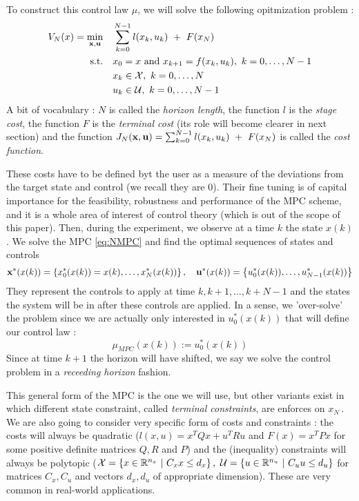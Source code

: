 \documentclass[12pt]{article}
\begin{document}
To construct this control law $\mu$, we will solve the following opitmization problem :
\begin{align}
	\begin{split}
		\label{eq:NMPC}
		V_N(x)=\underset{\bf{x},\bf{u}}{\min} &\quad \sum_{k=0}^{N-1}l(x_k,u_k)~+~F(x_N)\\
		\text{s.t.} &\quad x_0=x\text{ and }x_{k+1}=f(x_k,u_k),~k=0,\dots,N-1\\
		&\quad x_k\in\cal{X},~k=0,\dots,N\\
		&\quad u_k\in\cal{U},~k=0,\dots,N-1
	\end{split}
\end{align}
A bit of vocabulary : $N$ is called the \textit{horizon length}, the function $l$ is the \textit{stage cost}, the function $F$ is the \textit{terminal cost} (its role will become clearer in next section) and the function $J_N(\bf{x},\bf{u})=\sum_{k=0}^{N-1}l(x_k,u_k)~+~F(x_N)$ is called the \textit{cost function}.

These costs have to be defined byt the user as a measure of the deviations from the target state and control (we recall they are 0).
Their fine tuning is of capital importance for the feasibility, robustness and performance of the MPC scheme, and it is a whole area of interest of control theory (which is out of the scope of this paper).
Then, during the experiment, we observe at a time $k$ the state $x(k)$.
We solve the MPC \ref{eq:NMPC} and find the optimal sequences of states and controls $$\bf{x}^*(x(k))=\left\{ x_0^*(x(k))=x(k),\dots,x_N^*(x(k))\right\},\quad \bf{u}^*(x(k))=\left\{ u_0^*(x(k)),\dots,u_{N-1}^*(x(k))\right\}$$
They represent the controls to apply at time $k,k+1,\dots,k+N-1$ and the states the system will be in after these controls are applied.
In a sense, we 'over-solve' the problem since we are actually only interested in $u_0^*(x(k))$ that will define our control law :
$$\mu_{MPC}(x(k)):=u_0^*(x(k))$$
Since at time $k+1$ the horizon will have shifted, we say we solve the control problem in a \textit{receeding horizon} fashion.

\vspace{12pt}

This general form of the MPC is the one we will use, but other variants exist in which different state constraint, called \textit{terminal constraints}, are enforces on $x_N$\,.
We are also going to consider very specific form of costs and constraints : the costs will always be quadratic ($l(x,u)=x^TQx+u^TRu$ and $F(x)=x^TPx$ for some positive definite matrices $Q,R$ and $P$) and the (inequality) constraints will always be polytopic ($\cal{X}=\left\{x\in\R^{n_x}~|~C_xx\leq d_x\right\},~\cal{U}=\left\{u\in\R^{n_u}~|~C_uu\leq d_u\right\}$ for matrices $C_x,C_u$ and vectors $d_x,d_u$ of appropriate dimension).
These are very common in real-world applications.
\end{document}
